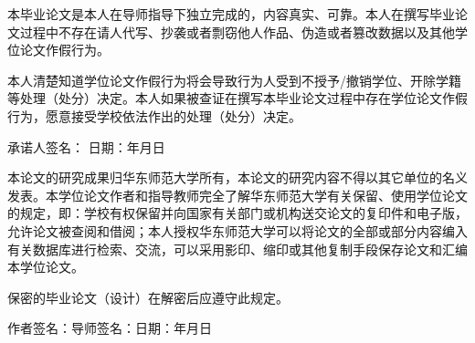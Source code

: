 \clearpage 

{\vspace{\baselineskip}} %

\begin{center}
  \bfseries{}
\end{center}

\par 本毕业论文是本人在导师指导下独立完成的，内容真实、可靠。本人在撰写毕业论文过程中不存在请人代写、抄袭或者剽窃他人作品、伪造或者篡改数据以及其他学位论文作假行为。

\par 本人清楚知道学位论文作假行为将会导致行为人受到不授予/撤销学位、开除学籍等处理（处分）决定。本人如果被查证在撰写本毕业论文过程中存在学位论文作假行为，愿意接受学校依法作出的处理（处分）决定。

\par 承诺人签名：\hspace{14em} 日期：\hspace{2em}年\hspace{2em}月\hspace{2em}日


\vspace{\baselineskip} %
\vspace{\baselineskip} %
\vspace{\baselineskip} %

\begin{center}
  \bfseries{}
\end{center}

\par 本论文的研究成果归华东师范大学所有，本论文的研究内容不得以其它单位的名义发表。本学位论文作者和指导教师完全了解华东师范大学有关保留、使用学位论文的规定，即：学校有权保留并向国家有关部门或机构送交论文的复印件和电子版，允许论文被查阅和借阅；本人授权华东师范大学可以将论文的全部或部分内容编入有关数据库进行检索、交流，可以采用影印、缩印或其他复制手段保存论文和汇编本学位论文。

\par 保密的毕业论文（设计）在解密后应遵守此规定。

\vspace{\baselineskip}
\par 作者签名：\hspace{6em}导师签名：\hspace{5em}日期：\hspace{2em}年\hspace{2em}月\hspace{2em}日
